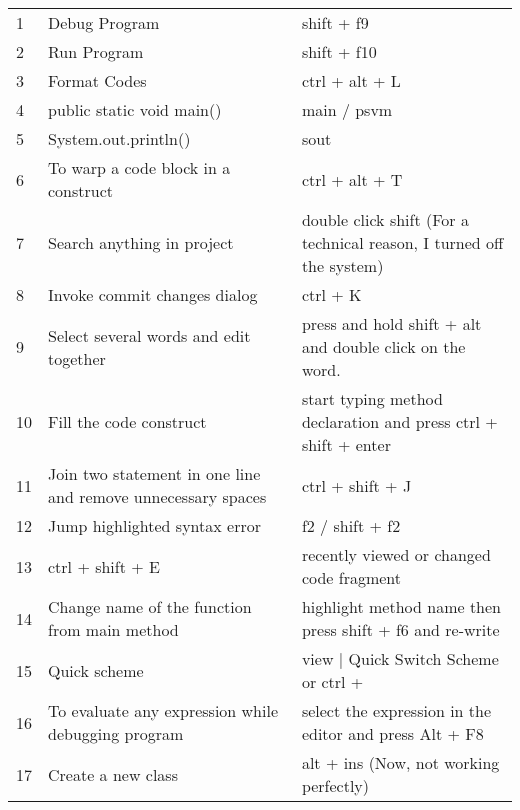 \documentclass[11 pt]{article}
\begin{document}

\begin{center}
	\begin{longtable}{|| m{1 em} || m{15 em} m{17 em} ||}
		\hline\hline
		\rowcolor{teal!20}
		\multicolumn{3}{c}{\textbf{\textsf{\textcolor{black}{IntelliJ IDEA Commands and Shortcuts}}}}\\
		\hline\hline
		1 & Debug Program & shift + f9\\
		\hline
		2 & Run Program & shift + f10\\
		\hline
		3 & Format Codes & ctrl + alt + L\\
		\hline
		4 & public static void main() & main / psvm\\
		\hline
		5 & System.out.println() & sout\\
		\hline
		6 & To warp a code block in a construct & ctrl + alt + T\\
		\hline
		7 & Search anything in project & double click shift (For a technical reason, I turned off the system)\\
		\hline
		8 & Invoke commit changes dialog & ctrl + K\\
		\hline
		9 & Select several words and edit together & press and hold shift + alt and double click on the word.\\
		\hline
		10 & Fill the code construct & start typing method declaration and press ctrl + shift + enter\\
		\hline
		11 & Join two statement in one line and remove unnecessary spaces & ctrl + shift + J\\
		\hline
		12 & Jump highlighted syntax error & f2 / shift + f2\\
		\hline
		13 & ctrl + shift + E & recently viewed or changed code fragment\\
		\hline
		14 & Change name of the function from main method & highlight method name then press shift + f6 and re-write\\
		\hline
		\rowcolor{red}
		15 & Quick scheme & view | Quick Switch Scheme or ctrl +  \\
		\hline
		16 & To evaluate any expression while debugging program & select the expression in the editor and press Alt + F8\\
		\hline
		17 & Create a new class & alt + ins (Now, not working perfectly)\\

\end{longtable}
\end{center}
\end{document}
